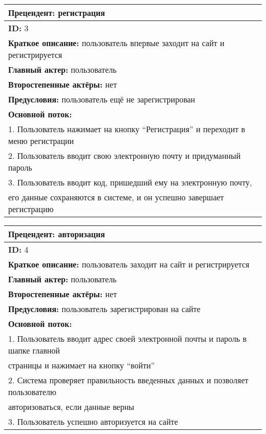 \documentclass[12pt]{article}
\begin{document}
\begin{table}[H]
\begin{tabular}{|l|}
    \hline
    \textbf{Прецендент:} регистрация\\
    \hline
    \textbf{ID:} 3 \\
    \hline
    \textbf{Краткое описание:} пользователь впервые заходит на сайт и регистрируется \\
    \hline
    \textbf{Главный актер:} пользователь \\
    \hline
    \textbf{Второстепенные актёры:} нет \\
    \hline
    \textbf{Предусловия:} пользователь ещё не зарегистрирован \\
    \hline 
    \textbf{Основной поток:} \\
    1. Пользователь нажимает на кнопку \enquote{Регистрация} и переходит в меню регистрации \\
    2. Пользователь вводит свою электронную почту и придуманный пароль \\
    3. Пользователь вводит код, пришедший ему на электронную почту, \\ его данные сохраняются в системе, и он успешно завершает регистрацию \\
    \hline
\end{tabular}
\end{table}

\begin{table}[H]
\begin{tabular}{|l|}
    \hline
    \textbf{Прецендент:} авторизация \\
    \hline
    \textbf{ID:} 4 \\
    \hline
    \textbf{Краткое описание:} пользователь заходит на сайт и регистрируется \\
    \hline
    \textbf{Главный актер:} пользователь  \\
    \hline
    \textbf{Второстепенные актёры:} нет \\
    \hline
    \textbf{Предусловия:} пользователь зарегистрирован на сайте \\
    \hline 
    \textbf{Основной поток:} \\
    1. Пользователь вводит адрес своей электронной почты и пароль в шапке главной \\
    страницы и нажимает на кнопку \enquote{войти} \\
    2. Система проверяет правильность введенных данных и позволяет пользователю \\
    авторизоваться, если данные верны \\
    3. Пользователь успешно авторизуется на сайте \\
    \hline
\end{tabular}
\end{table}
\end{document}
